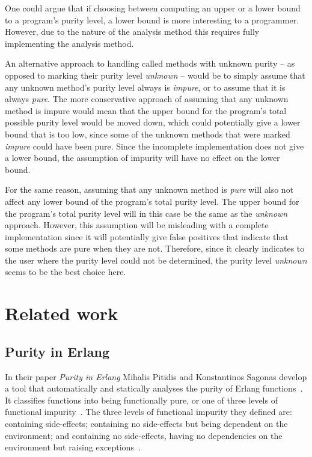 \documentclass[a4paper,12pt]{article}
\begin{document}
One could argue that if choosing between computing an upper or a lower bound to a program's purity level, a lower bound is more interesting to a programmer. However, due to the nature of the analysis method this requires fully implementing the analysis method.

An alternative approach to handling called methods with unknown purity -- as opposed to marking their purity level \textit{unknown} -- would be to simply assume that any unknown method's purity level always is \textit{impure}, or to assume that it is always \textit{pure}. The more conservative approach of assuming that any unknown method is impure would mean that the upper bound for the program's total possible purity level would be moved down, which could potentially give a lower bound that is too low, since some of the unknown methods that were marked \textit{impure} could have been pure. Since the incomplete implementation does not give a lower bound, the assumption of impurity will have no effect on the lower bound.

For the same reason, assuming that any unknown method is \textit{pure} will also not affect any lower bound of the program's total purity level. The upper bound for the program's total purity level will in this case be the same as the \textit{unknown} approach. However, this assumption will be misleading with a complete implementation since it will potentially give false positives that indicate that some methods are pure when they are not. Therefore, since it clearly indicates to the user where the purity level could not be determined, the purity level \textit{unknown} seems to be the best choice here.


\section{Related work} \label{sec:Related work} %


\subsection{Purity in Erlang} \label{sub:Purity-in-Erlang}
In their paper \textit{Purity in Erlang} Mihalis Pitidis and Konstantinos Sagonas develop a tool that automatically and statically analyses the purity of Erlang functions~\cite{pitidis2010purity}. It classifies functions into being functionally pure, or one of three levels of functional impurity~\cite{pitidis2010purity}.
The three levels of functional impurity they defined are: containing side-effects; containing no side-effects but being dependent on the environment; and containing no side-effects, having no dependencies on the environment but raising exceptions~\cite{pitidis2010purity}.
\end{document}
